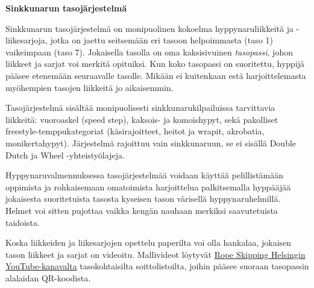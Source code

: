 \documentclass{article}
\begin{document}
\hfill%
\begin{minipage}[t]{0.75\textwidth} %
    {\Huge \bfseries Sinkkunarun tasojärjestelmä} %

	\setlength{\parindent}{0em} %
	\setlength{\parskip}{.7em} %
	\vspace*{5mm}
	Sinkkunarun tasojärjestelmä on monipuolinen kokoelma
	hyppynaruliikkeitä ja \mbox{-liikesarjoja}, jotka on jaettu seitsemään eri tasoon
	helpoimmasta (taso 1) vaikeimpaan (taso 7). Jokaisella tasolla on oma
	kaksisivuinen \emph{tasopassi}, johon liikkeet ja sarjat voi merkitä
	opituiksi.  Kun koko tasopassi on suoritettu, hyppijä pääsee etenemään
	seuraavalle tasolle. Mikään ei kuitenkaan estä harjoittelemasta myöhempien
	tasojen liikkeitä jo aikaisemmin.

	Tasojärjestelmä sisältää monipuolisesti sinkkunarukilpailuissa tarvittavia
	liikkeitä: vuoroaskel (speed step), kaksois- ja komoishypyt, sekä pakolliset
	freestyle-temppukategoriat (käsirajoitteet, heitot ja wrapit, akrobatia,
	monikertahypyt). Järjestelmä rajoittuu vain sinkkunaruun, se ei sisällä
	Double Dutch ja Wheel \mbox{-yhteistyölajeja}.

	Hyppynaruvalmennuksessa tasojärjestelmää voidaan käyttää pelillistämään
	oppimista ja rohkaisemaan omatoimista harjoittelua palkitsemalla hyppääjää
	jokaisesta suoritetuista tasosta kyseisen tason värisellä hyppynaruhelmillä.
	Helmet voi sitten pujottaa vaikka kengän nauhaan merkiksi saavutetuista
	taidoista.

	Koska liikkeiden ja liikesarjojen opettelu paperilta voi olla hankalaa,
	jokaisen tason liikkeet ja sarjat on videoitu. Mallivideot löytyvät
	\href{https://www.youtube.com/@RopeSkippingHelsinki}{Rope Skipping Helsingin
	YouTube-kanavalta} tasokohtaisilta soittolistoilta, joihin pääsee suoraan
	tasopassin alalaidan QR-koodista.
\end{minipage}

\vspace*{-1em}
\end{document}
